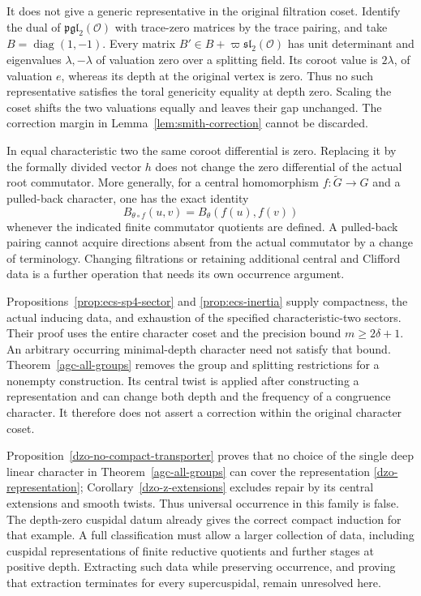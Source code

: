 \documentclass[10pt]{amsart}
\newcommand{\Ocal}{\mathcal O}
\begin{document}
It does not give a generic representative in the original filtration coset.
Identify the dual of $\mathfrak{pgl}_2(\Ocal)$ with trace-zero matrices by the trace
pairing, and take $B=\operatorname{diag}(1,-1)$. Every matrix
$B'\in B+\varpi\mathfrak{sl}_2(\Ocal)$ has unit determinant and eigenvalues
$\lambda,-\lambda$ of valuation zero over a splitting field. Its coroot value is
$2\lambda$, of valuation $e$, whereas its depth at the original vertex is zero.
Thus no such representative satisfies the toral genericity equality at depth
zero. Scaling the coset shifts the two valuations equally and leaves their gap
unchanged. The correction margin in Lemma~\ref{lem:smith-correction} cannot be
discarded.

In equal characteristic two the same coroot differential is zero. Replacing it
by the formally divided vector $h$ does not change the zero differential of the
actual root commutator. More generally, for a central homomorphism
$f:\widetilde G\to G$ and a pulled-back character, one has the exact identity
\[
 B_{\theta\circ f}(u,v)=B_\theta(f(u),f(v))
\]
whenever the indicated finite commutator quotients are defined. A pulled-back
pairing cannot acquire directions absent from the actual commutator by a change
of terminology. Changing filtrations or retaining additional central and
Clifford data is a further operation that needs its own occurrence argument.

Propositions~\ref{prop:ecs-sp4-sector} and \ref{prop:ecs-inertia} supply compactness,
the actual inducing data, and exhaustion of the specified characteristic-two
sectors. Their proof uses the entire character coset and the precision bound
$m\ge2\delta+1$. An arbitrary occurring minimal-depth character need not satisfy
that bound. Theorem~\ref{agc-all-groups} removes the group and splitting restrictions
for a nonempty construction. Its central twist is applied after constructing a
representation and can change both depth and the frequency of a congruence character.
It therefore does not assert a correction within the original character coset.

Proposition~\ref{dzo-no-compact-transporter} proves that no choice of the single
deep linear character in Theorem~\ref{agc-all-groups} can cover the representation
\eqref{dzo-representation}; Corollary~\ref{dzo-z-extensions} excludes repair by its
central extensions and smooth twists. Thus universal occurrence in this family
is false. The depth-zero cuspidal datum already gives the correct compact induction
for that example. A full classification must allow a larger collection of data,
including cuspidal representations of finite reductive quotients and further stages
at positive depth. Extracting such data while preserving occurrence, and proving
that extraction terminates for every supercuspidal, remain unresolved here.
\end{document}
